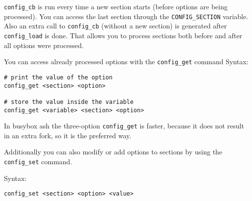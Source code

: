 \texttt{config\_cb} is run every time a new section starts (before options are being
processed). You can access the last section through the \texttt{CONFIG\_SECTION}
variable. Also an extra call to \texttt{config\_cb} (without a new section) is generated
after \texttt{config\_load} is done.
That allows you to process sections both before and after all options were
processed.

You can access already processed options with the \texttt{config\_get} command
Syntax:

\begin{Verbatim}
# print the value of the option
config_get <section> <option>

# store the value inside the variable
config_get <variable> <section> <option>
\end{Verbatim}

In busybox ash the three-option \texttt{config\_get} is faster, because it does not
result in an extra fork, so it is the preferred way.

Additionally you can also modify or add options to sections by using the
\texttt{config\_set} command.

Syntax:

\begin{Verbatim}
config_set <section> <option> <value>
\end{Verbatim}

